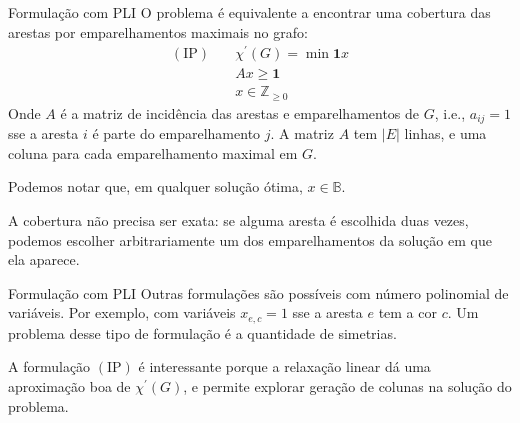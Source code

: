\documentclass{beamer}
\begin{document}
    \begin{frame}{Formulação com PLI}
        O problema é equivalente a encontrar uma cobertura das arestas por emparelhamentos maximais no grafo:
        {\color{blue}
            \begin{align*}
                (\mathrm{IP})\quad&\chi^\prime(G) = \min \mathbf{1} x\\
                &Ax \geq \mathbf{1}\\
                &x \in \mathbb{Z}_{\geq 0}
            \end{align*}
        }
        Onde {\color{blue} $A$} é a matriz de incidência das arestas e emparelhamentos de {\color{blue} $G$}, i.e., {\color{blue} $a_{ij} = 1$} sse a aresta {\color{blue} $i$} é parte do emparelhamento {\color{blue} $j$}.
        \pause
        A matriz {\color{blue} $A$} tem {\color{blue} $|E|$} linhas, e uma coluna para cada emparelhamento maximal em {\color{blue} $G$}.

        \pause
        \vspace{.25cm}
        Podemos notar que, em qualquer solução ótima, {\color{blue} $x \in \mathbb{B}$}.

        \pause
        \vspace{.25cm}
        A cobertura não precisa ser exata: se alguma aresta é escolhida duas vezes, podemos escolher arbitrariamente um dos emparelhamentos da solução em que ela aparece.
    \end{frame}

    \begin{frame}{Formulação com PLI}
        Outras formulações são possíveis com número polinomial de variáveis. Por exemplo, com variáveis {\color{blue} $x_{e,c} = 1$} sse a aresta {\color{blue} $e$} tem a cor {\color{blue} $c$}. Um problema desse tipo de formulação é a quantidade de simetrias.

        \vspace{.5cm}
        \pause
        A formulação {\color{blue} $(\mathrm{IP})$} é interessante porque a relaxação linear dá uma aproximação boa de {\color{blue} $\chi^\prime(G)$}, e permite explorar geração de colunas na solução do problema.
    \end{frame}
\end{document}
